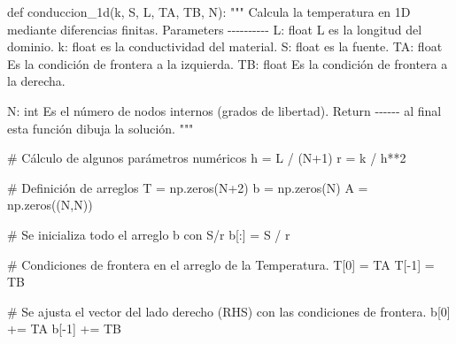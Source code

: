 \documentclass[
  letterpaper,
  DIV=11,
  numbers=noendperiod]{scrreprt}
\newenvironment{Shaded}{\begin{snugshade}}{\end{snugshade}}
\newcommand{\CommentTok}[1]{\textcolor[rgb]{0.37,0.37,0.37}{#1}}
\newcommand{\DecValTok}[1]{\textcolor[rgb]{0.68,0.00,0.00}{#1}}
\newcommand{\KeywordTok}[1]{\textcolor[rgb]{0.00,0.23,0.31}{#1}}
\newcommand{\NormalTok}[1]{\textcolor[rgb]{0.00,0.23,0.31}{#1}}
\newcommand{\OperatorTok}[1]{\textcolor[rgb]{0.37,0.37,0.37}{#1}}
\begin{document}
\begin{Shaded}
\begin{Highlighting}[]
\KeywordTok{def}\NormalTok{ conduccion\_1d(k, S, L, TA, TB, N):}
    \CommentTok{"""}
\CommentTok{    Calcula la temperatura en 1D mediante diferencias finitas.}
\CommentTok{    }
\CommentTok{    Parameters}
\CommentTok{    {-}{-}{-}{-}{-}{-}{-}{-}{-}{-}    }
\CommentTok{    L: float}
\CommentTok{    L es la longitud del dominio.}
\CommentTok{    }
\CommentTok{    k: float}
\CommentTok{    es la conductividad del material.}
\CommentTok{    }
\CommentTok{    S: float}
\CommentTok{    es la fuente.}
\CommentTok{    }
\CommentTok{    TA: float}
\CommentTok{    Es la condición de frontera a la izquierda.}
\CommentTok{    }
\CommentTok{    TB: float}
\CommentTok{    Es la condición de frontera a la derecha.}

\CommentTok{    N: int}
\CommentTok{    Es el número de nodos internos (grados de libertad).}
\CommentTok{    }
\CommentTok{    Return}
\CommentTok{    {-}{-}{-}{-}{-}{-}}
\CommentTok{    al final esta función dibuja la solución.}
\CommentTok{    """}

    \CommentTok{\# Cálculo de algunos parámetros numéricos}
\NormalTok{    h }\OperatorTok{=}\NormalTok{ L }\OperatorTok{/}\NormalTok{ (N}\OperatorTok{+}\DecValTok{1}\NormalTok{)}
\NormalTok{    r }\OperatorTok{=}\NormalTok{ k }\OperatorTok{/}\NormalTok{ h}\OperatorTok{**}\DecValTok{2}
    
    \CommentTok{\# Definición de arreglos }
\NormalTok{    T }\OperatorTok{=}\NormalTok{ np.zeros(N}\OperatorTok{+}\DecValTok{2}\NormalTok{)}
\NormalTok{    b }\OperatorTok{=}\NormalTok{ np.zeros(N)}
\NormalTok{    A }\OperatorTok{=}\NormalTok{ np.zeros((N,N))}

    \CommentTok{\# Se inicializa todo el arreglo b con S/r}
\NormalTok{    b[:] }\OperatorTok{=}\NormalTok{ S }\OperatorTok{/}\NormalTok{ r}

    \CommentTok{\# Condiciones de frontera en el arreglo de la Temperatura.}
\NormalTok{    T[}\DecValTok{0}\NormalTok{] }\OperatorTok{=}\NormalTok{ TA}
\NormalTok{    T[}\OperatorTok{{-}}\DecValTok{1}\NormalTok{] }\OperatorTok{=}\NormalTok{ TB}
    
    \CommentTok{\# Se ajusta el vector del lado derecho (RHS) con las condiciones de frontera.}
\NormalTok{    b[}\DecValTok{0}\NormalTok{] }\OperatorTok{+=}\NormalTok{ TA}
\NormalTok{    b[}\OperatorTok{{-}}\DecValTok{1}\NormalTok{] }\OperatorTok{+=}\NormalTok{ TB}


\end{Highlighting}
\end{Shaded}
\end{document}
